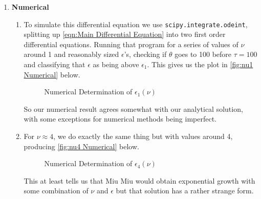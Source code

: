 \documentclass[12pt]{article}
\begin{document}
\begin{enumerate}
        \item \textbf{Numerical}
        \begin{enumerate}
            \item To simulate this differential equation we use \texttt{scipy.integrate.odeint}, 
            splitting up \autoref{eqn:Main Differential Equation} into two first order differential 
            equations. Running that program for a series of values of $\nu$ around 1 and reasonably 
            sized $\epsilon$'s, checking if $\theta$ goes to 100 before $\tau = 100$ and classifying 
            that $\epsilon$ as being above $\epsilon_1$. This gives us the plot in 
            \autoref{fig:nu1 Numerical} below.
            \begin{figure}[H]
                \begin{center}
                    \scalebox{.7}{}
                    \caption{Numerical Determination of $\epsilon_1(\nu)$}
                    \label{fig:nu1 Numerical}
                \end{center}
            \end{figure}
            \noindent
            So our numerical result agrees somewhat with our analytical solution, with some 
            exceptions for numerical methods being imperfect.

            \item For $\nu \approx 4$, we do exactly the same thing but with values around 4, producing 
            \autoref{fig:nu4 Numerical} below.
            \begin{figure}[H]
                \begin{center}
                    \scalebox{.7}{}
                    \caption{Numerical Determination of $\epsilon_4(\nu)$}
                    \label{fig:nu4 Numerical}
                \end{center}
            \end{figure}
            \noindent
            This at least tells us that Miu Miu would obtain exponential growth with some combination 
            of $\nu$ and $\epsilon$ but that solution has a rather strange form.
            
        \end{enumerate}
    \end{enumerate}
\end{document}

